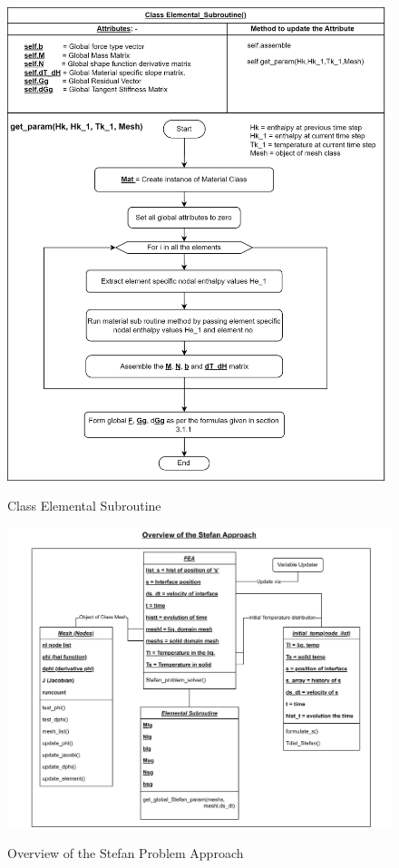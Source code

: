 \begin{figure}[htb]
  \centering
  \includegraphics[width=13cm]{img/ElementalSubroution.drawio.png}\\
  \caption{Class Elemental Subroutine}
  \label{fig:Elemental Subroution}
\end{figure}
\begin{figure}[htb]
  \centering
  \includegraphics[width=13cm]{img/Stefan_Overview.png}\\
  \caption{Overview of the Stefan Problem Approach}
  \label{fig:overview Stefan Subroution}
\end{figure}
